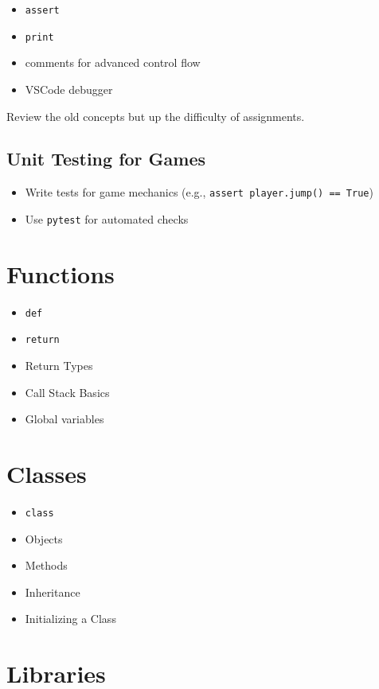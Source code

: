 \documentclass{article}
\begin{document}
\begin{itemize}
    \item \verb|assert|
    \item \verb|print|
    \item comments for advanced control flow
    \item VSCode debugger
\end{itemize} 

Review the old concepts but up the difficulty of assignments. 

\subsection{Unit Testing for Games}
\begin{itemize}
    \item Write tests for game mechanics (e.g., \verb|assert player.jump() == True|)
    \item Use \verb|pytest| for automated checks
\end{itemize}

\section{Functions}

\begin{itemize}
    \item \verb|def|
    \item \verb|return|
    \item Return Types
    \item Call Stack Basics
    \item Global variables
\end{itemize}

\section{Classes}

\begin{itemize}
    \item \verb|class|
    \item Objects
    \item Methods
    \item Inheritance
    \item Initializing a Class
\end{itemize}

\section{Libraries}
\end{document}
